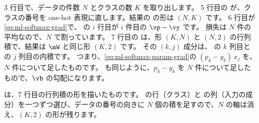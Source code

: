 
3 行目で、データの件数 $N$ とクラスの数 $K$ を取り出します。
5 行目の  が、クラスの番号を one-hot 表現に直します。結果の  の形は $(N, K)$ です。
6 行目が\eqref{eq:ml-softmax-grad}で、 の $i$ 行目が $i$ 件目の $\vp-\vy$ です。
損失は $N$ 件の平均なので、$N$ で割っています。
7 行目の  は、形 $(K, N)$ と $(N, 2)$ の行列積で、結果は $\mW$ と同じ形 $(K, 2)$ です。
その $(k, j)$ 成分は、 の $k$ 列目と  の $j$ 列目の内積です。
つまり、\eqref{eq:ml-softmax-param-grad}の $(p_k-y_k)\,x_j$ を、$N$ 件について足したものです。
 も同じように、$p_k-y_k$ を $N$ 件について足したもので、$\vb$ の勾配になります。

は、7 行目の行列積の形を描いたものです。
 の行（クラス）と  の列（入力の成分）を一つずつ選び、データの番号の向きに $N$ 個の積を足すので、$N$ の軸は消え、$(K,2)$ の形が残ります。

